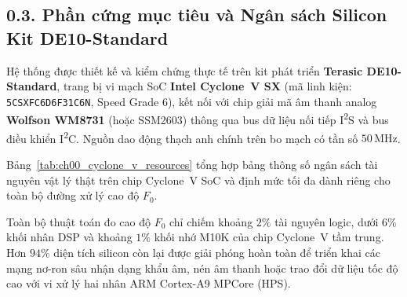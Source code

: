 \subsection*{0.3. Phần cứng mục tiêu và Ngân sách Silicon Kit DE10-Standard}

Hệ thống được thiết kế và kiểm chứng thực tế trên kit phát triển \textbf{Terasic DE10-Standard}, trang bị vi mạch SoC \textbf{Intel Cyclone~V SX} (mã linh kiện: \texttt{5CSXFC6D6F31C6N}, Speed Grade 6), kết nối với chip giải mã âm thanh analog \textbf{Wolfson WM8731} (hoặc SSM2603) thông qua bus dữ liệu nối tiếp I\textsuperscript{2}S và bus điều khiển I\textsuperscript{2}C. Nguồn dao động thạch anh chính trên bo mạch có tần số $50\,\text{MHz}$.

Bảng~\ref{tab:ch00_cyclone_v_resources} tổng hợp bảng thông số ngân sách tài nguyên vật lý thật trên chip Cyclone~V SoC và định mức tối đa dành riêng cho toàn bộ đường xử lý cao độ $F_0$.

\begin{table}[H]
\centering
\small
\caption{Bảng phân bổ ngân sách tài nguyên trên chip Intel Cyclone~V 5CSXFC6D6F31C6N}
\label{tab:ch00_cyclone_v_resources}
\end{table}

\begin{physicalinsight}
Toàn bộ thuật toán đo cao độ $F_0$ chỉ chiếm khoảng $2\%$ tài nguyên logic, dưới $6\%$ khối nhân DSP và khoảng $1\%$ khối nhớ M10K của chip Cyclone~V tầm trung. Hơn $94\%$ diện tích silicon còn lại được giải phóng hoàn toàn để triển khai các mạng nơ-ron sâu nhận dạng khẩu âm, nén âm thanh hoặc trao đổi dữ liệu tốc độ cao với vi xử lý hai nhân ARM Cortex-A9 MPCore (HPS).
\end{physicalinsight}

